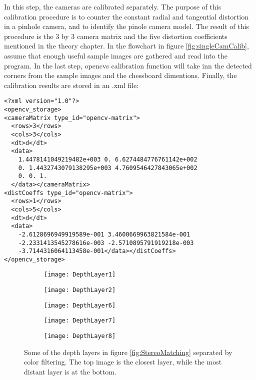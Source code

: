 In this step, the cameras are calibrated separately.  The purpose of this calibration procedure is to counter the constant radial and tangential distortion in a pinhole camera, and to identify the pinole camera model. The result of this procedure is the 3 by 3 camera matrix and the five distortion coefficients mentioned in the theory chapter. In the flowchart in figure \ref{fig:singleCamCalib}, assume that enough useful sample images are gathered and read into the program. In the last step, \gls{opencv}s calibration function will take inn the detected corners from the sample images and the chessboard dimentions. Finally, the calibration results are stored in an .xml file:

\begin{verbatim}
<?xml version="1.0"?>
<opencv_storage>
<cameraMatrix type_id="opencv-matrix">
  <rows>3</rows>
  <cols>3</cols>
  <dt>d</dt>
  <data>
    1.4478141049219482e+003 0. 6.6274484776761142e+002 
    0. 1.4432743079138295e+003 4.7609546427843065e+002 
    0. 0. 1.
  </data></cameraMatrix>
<distCoeffs type_id="opencv-matrix">
  <rows>1</rows>
  <cols>5</cols>
  <dt>d</dt>
  <data>
    -2.6128696949919589e-001 3.4600669963821584e-001
    -2.2331413545278616e-003 -2.5710895791919218e-003
    -3.7144316064113458e-001</data></distCoeffs>
</opencv_storage>
\end{verbatim}

\newpage

\begin{wrapfigure}{R}{0.4\textwidth}
\centering

	\begin{subfigure}[b]{0.35\textwidth}
        \texttt{[image: DepthLayer1]}
	\end{subfigure}
	\par\medskip
	\begin{subfigure}[b]{0.35\textwidth}
        \texttt{[image: DepthLayer2]}
	\end{subfigure}
	\par\medskip
	\begin{subfigure}[b]{0.35\textwidth}
        \texttt{[image: DepthLayer6]}
	\end{subfigure}
	\par\medskip
	\begin{subfigure}[b]{0.35\textwidth}
        \texttt{[image: DepthLayer7]}
	\end{subfigure}
	\par\medskip
	\begin{subfigure}[b]{0.35\textwidth}
        \texttt{[image: DepthLayer8]}
	\end{subfigure}
	
\caption{Some of the depth layers in figure \ref{fig:StereoMatching} separated by color filtering. The top image is the closest layer, while the most distant layer is at the bottom.}
\label{fig:layers2}
\end{wrapfigure}

